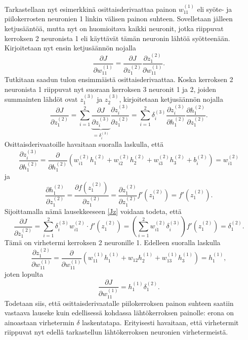 \documentclass[12pt,a4paper,finnish,oneside,titlepage]{article}
\theoremstyle{plain}
\theoremstyle{definition}
\theoremstyle{remark}
\begin{document}
Tarkastellaan nyt esimerkkinä osittaisderivaattaa painon \(w_{11}^{(1)}\) eli syöte- ja piilokerrosten neuronien 1 linkin välisen painon suhteen. Sovelletaan jälleen ketjusääntöä, mutta nyt on huomioitava kaikki neuronit, jotka riippuvat kerroksen 2 neuronista 1 eli käyttävät tämän neuronin lähtöä syötteenään. Kirjoitetaan nyt ensin ketjusäännön nojalla \[\frac{\partial J}{\partial w_{11}^{(1)}}=\frac{\partial J}{\partial z_1^{(2)}} \frac{\partial z_1^{(2)}}{\partial w_{11}^{(1)}}.\]
Tutkitaan saadun tulon ensimmäistä osittaisderivaattaa. Koska kerroksen 2 neuronista 1 riippuvat nyt suoraan kerroksen 3 neuronit 1 ja 2, joiden summainten lähdöt ovat \(z_1^{(3)}\) ja \(z_2^{(3)}\), kirjoitetaan ketjusäännön nojalla \begin{equation}\label{Jz} \frac{\partial J}{\partial z_1^{(2)}}=\sum_{i=1}^{2} \underbrace{\frac{\partial J}{\partial z_i^{(3)}}}_{=\delta_i^{(3)}} \frac{\partial z_i^{(3)}}{\partial z_1^{(2)}}=\sum_{i=1}^{2} \delta_i^{(3)} \frac{\partial z_i^{(3)}}{\partial h_1^{(2)}} \frac{\partial h_1^{(2)}}{\partial z_1^{(2)}}.\end{equation} Osittaisderivaatoille havaitaan suoralla laskulla, että \[\frac{\partial z_i^{(3)}}{\partial h_1^{(2)}}=\frac{\partial}{\partial h_1^{(2)}}(w_{i1}^{(2)} h_1^{(2)} + w_{i2}^{(2)} h_2^{(2)} + w_{i3}^{(2)} h_3^{(2)} + b_i^{(2)})=w_{i1}^{(2)}\] ja \[\frac{\partial h_1^{(2)}}{\partial z_1^{(2)}}=\frac{\partial f(z_1^{(2)})}{\partial z_1^{(2)}}=\frac{\partial z_1^{(2)}}{\partial z_1^{(2)}} f'(z_1^{(2)})=f'(z_1^{(2)}).\] Sijoittamalla nämä lausekkeeseen \ref{Jz} voidaan todeta, että \[\frac{\partial J}{\partial z_1^{(2)}}=\sum_{i=1}^{2} \delta_i^{(3)}w_{i1}^{(2)}\cdot f'(z_1^{(2)})=\left(\sum_{i=1}^{2} w_{i1}^{(2)} \delta_i^{(3)}\right) f'(z_1^{(2)})=\delta_1^{(2)}.\] Tämä on virhetermi kerroksen 2 neuronille 1. Edelleen suoralla laskulla \[\frac{\partial z_1^{(2)}}{\partial w_{11}^{(1)}}=\frac{\partial}{\partial w_{11}^{(1)}}(w_{11}^{(1)} h_1^{(1)}+w_{12}h_2^{(1)}+w_{13}^{(1)}h_3^{(1)})=h_1^{(1)},\] joten lopulta \[\frac{\partial J}{\partial w_{11}^{(1)}}=h_1^{(1)} \delta_1^{(2)}.\] Todetaan siis, että osittaisderivaatalle piilokerroksen painon suhteen saatiin vastaava lauseke kuin edellisessä kohdassa lähtökerroksen painolle: erona on ainoastaan virhetermin \(\delta\) laskentatapa. Erityisesti havaitaan, että virhetermit riippuvat nyt edellä tarkastellun lähtökerroksen neuronien virhetermeistä.
\end{document}
